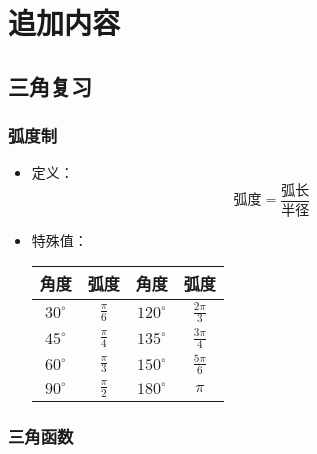 
\chapter{追加内容}

\section{三角复习}

\subsection{弧度制}

\begin{itemize}
    \item 定义：
    \begin{equation*}
        \textrm{弧度}=\frac{\textrm{弧长}}{\textrm{半径}}
    \end{equation*}
    \item 特殊值：
    \begin{center}
        \renewcommand\arraystretch{1.2}
        \begin{tabular}{c|c|c|c}
            \hline
            角度         & 弧度        & 角度         & 弧度 \\\hline
            $30^\circ$  & $\frac\pi6$ & $120^\circ$  & $\frac{2\pi}3$\\
            $45^\circ$  & $\frac\pi4$ & $135^\circ$  & $\frac{3\pi}4$\\
            $60^\circ$  & $\frac\pi3$ & $150^\circ$  & $\frac{5\pi}6$\\
            $90^\circ$  & $\frac\pi2$ & $180^\circ$  & $\pi$\\
            \hline
        \end{tabular}
    \end{center}
\end{itemize}

\subsection{三角函数}

